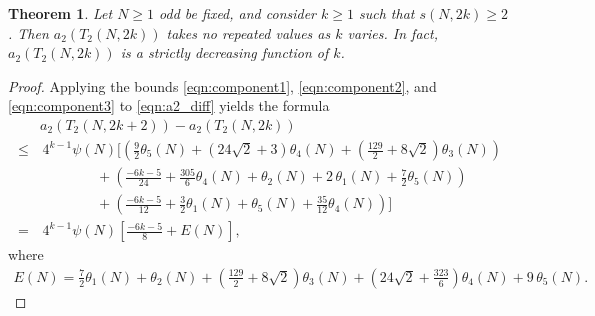 \documentclass[11pt,letterpaper,reqno]{amsart}
\numberwithin{figure}{section}
\numberwithin{table}{section}
\theoremstyle{definition}
\theoremstyle{plain}
\newcommand{\lrp}[1]{\left(#1\right)}
\newcommand{\lrb}[1]{\left[#1\right]}
\newtheorem{theorem}{Theorem}[section]
\theoremstyle{definition}
\theoremstyle{definition}
\theoremstyle{remark}
\numberwithin{equation}{section}
\begin{document}
{
\renewcommand{\thetheorem}{\ref{theorem:main}}
\begin{theorem}
    Let $N \ge 1$ odd be fixed, and consider $k \geq 1$ such that $s(N,2k) \ge 2$. Then 
    $a_2(T_2(N, 2k))$
    takes no repeated values as $k$ varies.
    In fact, $a_2(T_2(N, 2k))$ is a strictly decreasing function of $k$.
\end{theorem}
\addtocounter{theorem}{-1}
}

\begin{proof}

Applying the bounds \eqref{eqn:component1}, \eqref{eqn:component2}, and \eqref{eqn:component3} to \eqref{eqn:a2_diff} yields the formula
\begin{align}
    & a_2(T_2(N, 2k + 2)) - a_2(T_2(N, 2k)) \\
    \leq & \, 4^{k-1} \psi(N) \Bigg[
        \lrp{ 
            \frac92 \theta_5(N) + \lrp{24\sqrt{2} + 3} \theta_4(N) + \lrp{\frac{129}{2} + 8\sqrt{2}} \theta_3(N)
        } \\
        &\qquad\qquad +
        \lrp{
            \frac{-6k-5}{24} + \frac{305}{6} \theta_4(N) +  \theta_2(N) + 2\, \theta_1(N) + \frac72 \theta_5(N)  
        } \\
        &\qquad\qquad +
        \lrp{ 
            \frac{-6k-5}{12}  + \frac32 \theta_1(N) + \theta_5(N) + \frac{35}{12} \theta_4(N) 
        }
    \Bigg] \\
    =& \, 4^{k-1} \psi(N) \lrb{ \frac{-6k-5}{8} + E(N) },  \label{eqn:a2_diff_EN}
\end{align}
where
\begin{align} \label{eqn:EN-def}
    E(N) = \frac72 \theta_1(N) + \theta_2(N) + \lrp{\frac{129}{2} + 8\sqrt{2}} \theta_3(N) + \lrp{24\sqrt{2} + \frac{323}{6} } \theta_4(N) + 9\, \theta_5(N).
\end{align}


\end{proof}
\end{document}
